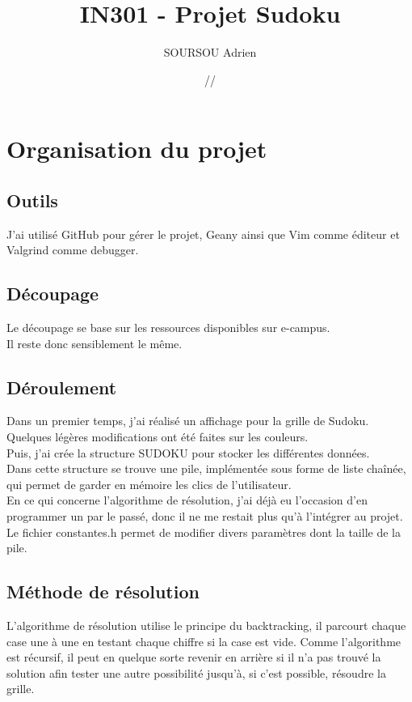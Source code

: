 \documentclass{article}
\title{\textbf{IN301 - Projet Sudoku}}
\author{SOURSOU Adrien}
\date{\oldstylenums{04}/\oldstylenums{01}/\oldstylenums{2019}}
\begin{document}
\maketitle

\newpage
\tableofcontents

\newpage
\section{Organisation du projet}

\subsection{Outils}
J'ai utilisé GitHub pour gérer le projet, Geany ainsi que Vim comme éditeur et Valgrind comme debugger.

\subsection{Découpage}
Le découpage se base sur les ressources disponibles sur e-campus. \\
Il reste donc sensiblement le même.

\subsection{Déroulement}
Dans un premier temps, j'ai réalisé un affichage pour la grille de Sudoku. \\
Quelques légères modifications ont été faites sur les couleurs. \\
Puis, j'ai crée la structure SUDOKU pour stocker les différentes données. \\
Dans cette structure se trouve une pile, implémentée sous forme de liste chaînée, qui permet de garder en mémoire les clics de l'utilisateur. \\
En ce qui concerne l'algorithme de résolution, j'ai déjà eu l'occasion d'en programmer un par le passé, donc il ne me restait plus qu'à l'intégrer au projet. \\
Le fichier constantes.h permet de modifier divers paramètres dont la taille de la pile.

\subsection{Méthode de résolution}
L'algorithme de résolution utilise le principe du backtracking, il parcourt chaque case une à une en testant chaque chiffre si la case est vide. Comme l'algorithme est récursif, il peut en quelque sorte revenir en arrière si il n'a pas trouvé la solution afin tester une autre possibilité jusqu'à, si c'est possible, résoudre la grille.
\end{document}
